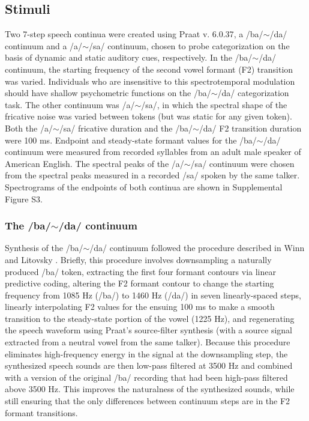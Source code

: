 \documentclass[../uwthesis.tex]{subfiles}
\begin{document}
\subsection{Stimuli}
Two 7-step speech continua were created using Praat v. 6.0.37\cite{Boersma2019Praat:Computer}, a /ba/$\sim$/da/ continuum and a /a/$\sim$/sa/ continuum, chosen to probe categorization on the basis of dynamic and static auditory cues, respectively. In the /ba/$\sim$/da/ continuum, the starting frequency of the second vowel formant (F2) transition was varied. Individuals who are insensitive to this spectrotemporal modulation should have shallow psychometric functions on the /ba/$\sim$/da/ categorization task. The other continuum was /a/$\sim$/sa/, in which the spectral shape of the fricative noise was varied between tokens (but was static for any given token). Both the /a/$\sim$/sa/ fricative duration and the /ba/$\sim$/da/ F2 transition duration were 100 ms. Endpoint and steady-state formant values for the /ba/$\sim$/da/ continuum were measured from recorded syllables from an adult male speaker of American English. The spectral peaks of the /a/$\sim$/sa/ continuum were chosen from the spectral peaks measured in a recorded /sa/ spoken by the same talker. Spectrograms of the endpoints of both continua are shown in Supplemental Figure S3.

\subsubsection{The /ba/$\sim$/da/ continuum}
Synthesis of the /ba/$\sim$/da/ continuum followed the procedure described in Winn and Litovsky \cite{Winn2015UsingImplants}. Briefly, this procedure involves downsampling a naturally produced /ba/ token, extracting the first four formant contours via linear predictive coding, altering the F2 formant contour to change the starting frequency from 1085 Hz (/ba/) to 1460 Hz (/da/) in seven linearly-spaced steps, linearly interpolating F2 values for the ensuing 100 ms to make a smooth transition to the steady-state portion of the vowel (1225 Hz), and regenerating the speech waveform using Praat's source-filter synthesis (with a source signal extracted from a neutral vowel from the same talker). Because this procedure eliminates high-frequency energy in the signal at the downsampling step, the synthesized speech sounds are then low-pass filtered at 3500 Hz and combined with a version of the original /ba/ recording that had been high-pass filtered above 3500 Hz. This improves the naturalness of the synthesized sounds, while still ensuring that the only differences between continuum steps are in the F2 formant transitions.
\end{document}
